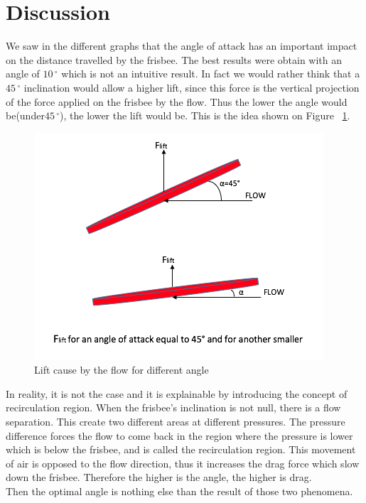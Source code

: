 \documentclass[10pt,a4paper]{report}
\begin{document}
\section{Discussion}
We saw in the different graphs that the angle of attack has an important impact on the distance travelled by the frisbee. The best results were obtain with an angle of $10\,^{\circ}$ which is not an intuitive result. In fact we would rather think that a $45\,^{\circ}$ inclination would allow a higher lift, since this force is the vertical projection of the force applied on the frisbee by the flow. Thus the lower the angle would be(under$45\,^{\circ}$), the lower the lift would be. This is the idea shown on Figure ~\ref{Lift cause by the flow for different angle}.
\begin{figure}[H]
\centering
\includegraphics[scale=0.6]{intuitive.jpg}
\caption{Lift cause by the flow for different angle}
\label{Lift cause by the flow for different angle}
\end{figure}
In reality, it is not the case and it is explainable by introducing the concept of recirculation region. When the frisbee's inclination is not null, there is a flow separation. This create two different areas at different pressures. The pressure difference forces the flow to come back in the region where the pressure is lower which is below the frisbee, and is called the recirculation region. This movement of air is opposed to the flow direction, thus it increases the drag force which slow down the frisbee. Therefore the higher is the angle, the higher is drag.
\\Then the optimal angle is nothing else than the result of those two phenomena.
\end{document}
